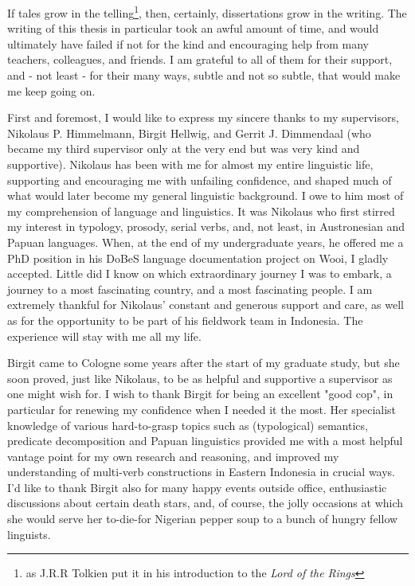 \begin{refsection}

If tales grow in the telling\footnote{as J.R.R Tolkien put it in his introduction to the \textit{Lord of the Rings}}, then, certainly, dissertations grow in the writing. The writing of this thesis in particular took an awful amount of time, and would ultimately have failed if not for the kind and encouraging help from many teachers, colleagues, and friends. I am grateful to all of them for their support, and - not least - for their many ways, subtle and not so subtle, that would make me keep going on.

First and foremost, I would like to express my sincere thanks to my supervisors, Nikolaus P. Himmelmann, Birgit Hellwig, and Gerrit J. Dimmendaal (who became my third supervisor only at the very end but was very kind and supportive). Nikolaus has been with me for almost my entire linguistic life, supporting and encouraging me with unfailing confidence, and shaped much of what would later become my general linguistic background. I owe to him most of my comprehension of language and linguistics. It was Nikolaus who first stirred my interest in typology, prosody, serial verbs, and, not least, in Austronesian and Papuan languages. When, at the end of my undergraduate years, he offered me a PhD position in his DoBeS language documentation project on Wooi, I gladly accepted. Little did I know on which extraordinary journey I was to embark, a journey to a most fascinating country, and a most fascinating people. I am extremely thankful for Nikolaus' constant and generous support and care, as well as for the opportunity to be part of his fieldwork team in Indonesia. The experience will stay with me all my life.

Birgit came to Cologne some years after the start of my graduate study, but she soon proved, just like Nikolaus, to be as helpful and supportive a supervisor as one might wish for. I wish to thank Birgit for being an excellent "good cop", in particular for renewing my confidence when I needed it the most. Her specialist knowledge of various hard-to-grasp topics such as (typological) semantics, predicate decomposition and Papuan linguistics provided me with a most helpful vantage point for my own research and reasoning, and improved my understanding of multi-verb constructions in Eastern Indonesia in crucial ways. I'd like to thank Birgit also for many happy events outside office, enthusiastic discussions about certain death stars, and, of course, the jolly occasions at which she would serve her to-die-for Nigerian pepper soup to a bunch of hungry fellow linguists.


\end{refsection}
